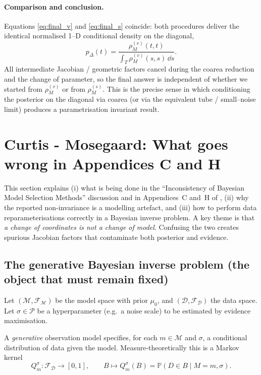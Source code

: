\documentclass[11pt]{article}
\theoremstyle{remark}
\newcommand{\modelspace}{\mathcal{M}}
\newcommand{\dataspace}{\mathcal{D}}
\newcommand{\propertyspace}{\mathcal{P}}
\begin{document}
\paragraph{Comparison and conclusion.}
Equations \eqref{eq:final_v} and \eqref{eq:final_s} coincide: both procedures
deliver the identical normalised 1--D conditional density on the diagonal,
\[
p_\Delta(t)
= \frac{\rho_M^{(v)}(t,t)}{\displaystyle\int_T \rho_M^{(v)}(s,s)\,\dd s }.
\]
All intermediate Jacobian / geometric factors cancel during the coarea
reduction and the change of parameter, so the final answer is independent of
whether we started from \(\rho_M^{(v)}\) or from \(\rho_M^{(s)}\). This is the
precise sense in which conditioning the posterior on the diagonal via coarea
(or via the equivalent tube / small--noise limit) produces a parametrisation
invariant result.


\section{Curtis - Mosegaard: What goes wrong in Appendices C and H}

This section explains (i) what is being done in the ``Inconsistency of Bayesian Model Selection Methods'' discussion and in Appendices~C and~H of \citet{MosegaardCurtis2024}, (ii) why the reported non-invariance is a modelling artefact, and (iii) how to perform data reparameterisations correctly in a Bayesian inverse problem. A key theme is that \emph{a change of coordinates is not a change of model}. Confusing the two creates spurious Jacobian factors that contaminate both posterior and evidence.

\subsection{The generative Bayesian inverse problem (the object that must remain fixed)}

Let \((\modelspace,\mathcal F_{\modelspace})\) be the model space with prior \(\mu_0\), and
\((\dataspace,\mathcal F_{\dataspace})\) the data space. Let \(\sigma\in\propertyspace\) be a
hyperparameter (e.g.\ a noise scale) to be estimated by evidence maximisation.

A \emph{generative} observation model specifies, for each \(m\in\modelspace\) and \(\sigma\),
a conditional distribution of data given the model. Measure-theoretically this is a Markov kernel
\[
Q_m^\sigma:\mathcal F_{\dataspace}\to[0,1],\qquad B\mapsto Q_m^\sigma(B)
=\mathbb P(D\in B\mid M=m,\sigma).
\]
\end{document}
